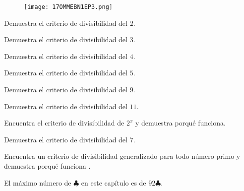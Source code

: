 \begin{figure}[h]
    \centering
    \texttt{[image: 17OMMEBN1EP3.png]}
\end{figure}

\begin{problem}[$3 \clubsuit$]
    Demuestra el criterio de divisibilidad del $2$.
\end{problem}

\begin{problem}[$4 \clubsuit$]
    Demuestra el criterio de divisibilidad del $3$.
\end{problem}

\begin{problem}[$3 \clubsuit$]
    Demuestra el criterio de divisibilidad del $4$.
\end{problem}

\begin{problem}[$3 \clubsuit$]
    Demuestra el criterio de divisibilidad del $5$.
\end{problem}

\begin{problem}[$4 \clubsuit$]
    Demuestra el criterio de divisibilidad del $9$.
\end{problem}

\begin{problem}[$4 \clubsuit$]
    Demuestra el criterio de divisibilidad del $11$.
\end{problem}

\begin{dproblem}[$4\clubsuit$]
    Encuentra el criterio de divisibilidad de $2^x$ y demuestra 
    porqué funciona.
\end{dproblem}

\begin{problem}[$6 \clubsuit$]
    Demuestra el criterio de divisibilidad del $7$.
\end{problem}

\begin{problem}[$7 \clubsuit$]
    \jp 
    Encuentra un criterio de divisibilidad generalizado para 
    todo número primo y demuestra porqué funciona .
\end{problem}

\noindent El máximo número de $\clubsuit$ en este capítulo es de 
$92 \clubsuit$.
